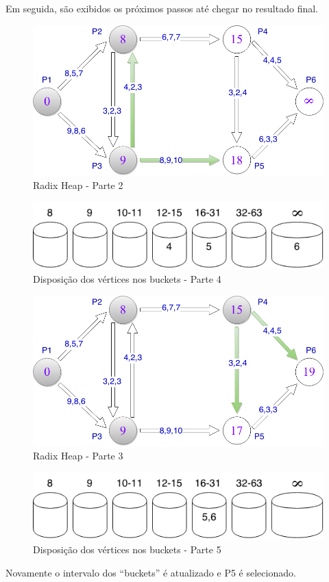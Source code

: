 Em seguida, são exibidos os próximos passos até chegar no resultado final.

\begin{figure}[htbp]
\centering
 \includegraphics[width=.50\textwidth]{chapters/fig/limitesup2.png}
\caption{Radix Heap - Parte 2}
\label{fig:limitesup2}
\end{figure}

\begin{figure}[htbp]
\centering
 \includegraphics[width=.50\textwidth]{chapters/fig/buckets4.png}
\caption{Disposição dos vértices nos buckets - Parte 4}
\label{fig:buckets4}
\end{figure}

\begin{figure}[htbp]
\centering
 \includegraphics[width=.50\textwidth]{chapters/fig/limitesup3.png}
\caption{Radix Heap - Parte 3}
\label{fig:limitesup3}
\end{figure}

\begin{figure}[htbp]
\centering
 \includegraphics[width=.50\textwidth]{chapters/fig/buckets5.png}
\caption{Disposição dos vértices nos buckets - Parte 5}
\label{fig:buckets5}
\end{figure}
\FloatBarrier

Novamente o intervalo dos ``buckets'' é atualizado e P5 é selecionado.

